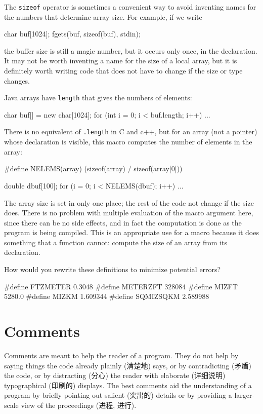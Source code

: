The \verb'sizeof' operator is sometimes a convenient way to avoid inventing
names for the numbers that determine array size. For example, if we write 
\begin{wellcode}
    char    buf[1024];
    fgets(buf, sizeof(buf), stdin);
\end{wellcode}
the buffer size is still a magic number, but it occurs only once, in the
declaration. It may not be worth inventing a name for the size of a local
array, but it is definitely worth writing code that does not have to change
if the size or type changes.

Java arrays have \verb'length' that gives the numbers of elements:
\begin{wellcode}
    char buf[] = new char[1024];
    for (int i = 0; i < buf.length; i++)
        ...
\end{wellcode}

There is no equivalent of \verb'.length' in C and c++, but for an array
(not a pointer) whose declaration is visible, this macro computes the
number of elements in the array:
\begin{wellcode}
    #define NELEMS(array) (sizeof(array) / sizeof(array[0]))

    double dbuf[100];
    for (i = 0; i < NELEMS(dbuf); i++)
        ...
\end{wellcode}
The array size is set in only one place; the rest of the code not change if
the size does. There is no problem with multiple evaluation of the macro
argument here, since there can be no side effects, and in fact the
computation is done as the program is being compiled. This is an
appropriate use for a macro because it does something that a function
cannot: compute the size of an array from its declaration.

\begin{exercise}
    How would you rewrite these definitions to minimize potential errors?
    \begin{badcode}
        #define FTZMETER    0.3048
        #define METERZFT    328084
        #define MIZFT       5280.0
        #define MIZKM       1.609344
        #define SQMIZSQKM   2.589988
    \end{badcode}
\end{exercise}

\section{Comments}
\label{sec:comments}
Comments are meant to help the reader of a program. They do not help by
saying things the code already plainly (清楚地) says, or by contradicting
(矛盾) the code, or by distracting (分心) the reader with elaborate
(详细说明) typographical (印刷的) displays. The best comments aid the
understanding of a program by briefly pointing out salient (突出的) details
or by providing a larger-scale view of the proceedings (进程, 进行).

